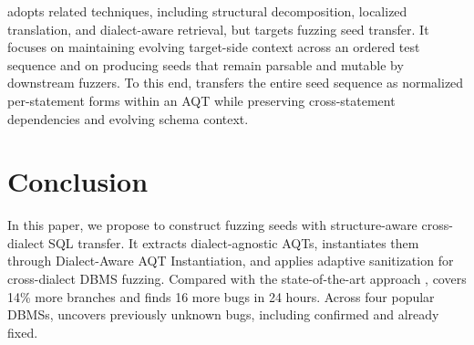 \documentclass[conference]{IEEEtran}
\begin{document}
\tool{} adopts related techniques, including structural decomposition, localized translation, and dialect-aware retrieval, but targets fuzzing seed transfer.
It focuses on maintaining evolving target-side context across an ordered test sequence and on producing seeds that remain parsable and mutable by downstream fuzzers.
To this end, \tool{} transfers the entire seed sequence as normalized per-statement forms within an AQT while preserving cross-statement dependencies and evolving schema context.


\section{Conclusion}
\label{sec:conclusion}
In this paper, we propose \tool{} to construct fuzzing seeds with structure-aware cross-dialect SQL transfer.
It extracts dialect-agnostic AQTs, instantiates them through Dialect-Aware AQT Instantiation, and applies adaptive sanitization for cross-dialect DBMS fuzzing. 
Compared with the state-of-the-art approach \sedar{}, \tool{} covers 14\% more branches and finds 16 more bugs in 24 hours. Across four popular DBMSs, \tool{} uncovers \bugcnt{} previously unknown bugs, including \bugconfirmcnt{} confirmed and \bugfixcnt{} already fixed.



\end{document}
